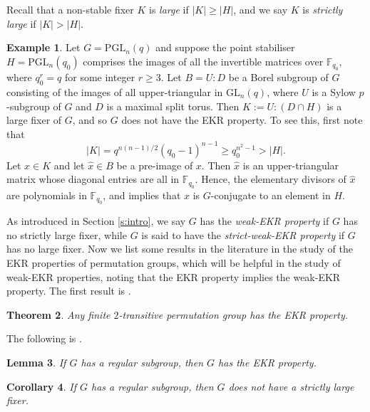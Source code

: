 \documentclass[twoside,a4paper,reqno,11pt]{amsart}
\newcommand{\<}{\langle}
\renewcommand{\>}{\rangle}
\newcommand{\geqs}{\geqslant}
\newcommand{\GL}{\mathrm{GL}}
\newcommand{\PGL}{\mathrm{PGL}}
\newtheorem{thm}{Theorem}[section]
\newtheorem{lem}[thm]{Lemma}
\newtheorem{cor}[thm]{Corollary}
\theoremstyle{definition}
\newtheorem{ex}[thm]{Example}
\begin{document}
	\label{ss:pre_large}
	
	Recall that a non-stable fixer $K$ is \textit{large} if $|K| \geqs |H|$, and we say $K$ is \textit{strictly large} if $|K| > |H|$.
	
	\begin{ex}
		\label{ex:subfield}
		Let $G=\PGL_n(q)$ and suppose the point stabiliser $H=\PGL_n(q_0)$ comprises the images of all the invertible matrices over $\mathbb{F}_{q_0}$, where $q_0^r = q$ for some integer $r\geqs 3$. Let $B = U{:}D$ be a Borel subgroup of $G$ consisting of the images of all upper-triangular in $\GL_n(q)$, where $U$ is a Sylow $p$-subgroup of $G$ and $D$ is a maximal split torus. Then $K:=U{:}(D\cap H)$ is a large fixer of $G$, and so $G$ does not have the EKR property. To see this, first note that
		\begin{equation*}
		|K| =q^{n(n-1)/2}(q_0-1)^{n-1}\geqs q_0^{n^2-1} > |H|.
		\end{equation*}
		Let $x\in K$ and let $\widehat{x}\in B$ be a pre-image of $x$. Then $\widehat{x}$ is an upper-triangular matrix whose diagonal entries are all in $\mathbb{F}_{q_0}$. Hence, the elementary divisors of $\widehat{x}$ are polynomials in $\mathbb{F}_{q_0}$, and \cite[Theorem 6.7.3]{H_alg} implies that $x$ is $G$-conjugate to an element in $H$.
	\end{ex}
	
	As introduced in Section \ref{s:intro}, we say $G$ has the \textit{weak-EKR property} if $G$ has no strictly large fixer, while $G$ is said to have the \textit{strict-weak-EKR property} if $G$ has no large fixer. Now we list some results in the literature in the study of the EKR properties of permutation groups, which will be helpful in the study of weak-EKR properties, noting that the EKR property implies the weak-EKR property. The first result is \cite[Theorem 1.1]{MST_2-trans}.
	
	\begin{thm}
		\label{t:2-trans}
		Any finite $2$-transitive permutation group has the EKR property.
	\end{thm}
	
	The following is \cite[Lemma 14.6.1]{GM_EKR}.
	
	\begin{lem}
		\label{l:pre_strict-ekr}
		If $G$ has a regular subgroup, then $G$ has the EKR property.
	\end{lem}
	
	\begin{cor}
		\label{c:pre_strict-ekr}
		If $G$ has a regular subgroup, then $G$ does not have a strictly large fixer.
	\end{cor}
	
\end{document}
